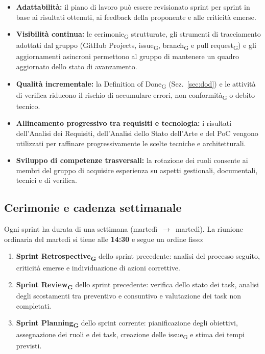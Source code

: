 \begin{itemize}
\item \textbf{Adattabilità:} il piano di lavoro può essere revisionato sprint per
sprint in base ai risultati ottenuti, ai feedback della proponente e alle
criticità emerse.
\item \textbf{Visibilità continua:} le cerimonie\textsubscript{G} strutturate, gli strumenti di tracciamento adottati dal gruppo (GitHub Projects,
issue\textsubscript{G}, branch\textsubscript{G} e pull request\textsubscript{G}) e
gli aggiornamenti asincroni permettono al gruppo di mantenere un quadro
aggiornato dello stato di avanzamento.
\item \textbf{Qualità incrementale:} la Definition of Done\textsubscript{G}
(Sez.~\ref{sec:dod}) e le attività di verifica riducono il rischio di
accumulare errori, non conformità\textsubscript{G} o debito tecnico.
\item \textbf{Allineamento progressivo tra requisiti e tecnologia:} i risultati
dell'Analisi dei Requisiti, dell'Analisi dello Stato dell'Arte e del PoC
vengono utilizzati per raffinare progressivamente le scelte tecniche e
architetturali.
\item \textbf{Sviluppo di competenze trasversali:} la rotazione dei ruoli
consente ai membri del gruppo di acquisire esperienza su aspetti
gestionali, documentali, tecnici e di verifica.
\end{itemize}

\subsection{Cerimonie e cadenza settimanale}

Ogni sprint ha durata di una settimana (martedì~$\rightarrow$~martedì).
La riunione ordinaria del martedì si tiene alle \textbf{14:30} e segue un ordine
fisso:
\begin{enumerate}
\item \textbf{Sprint Retrospective\textsubscript{G}} dello sprint precedente:
analisi del processo seguito, criticità emerse e individuazione di azioni
correttive.
\item \textbf{Sprint Review\textsubscript{G}} dello sprint precedente:
verifica dello stato dei task, analisi degli scostamenti tra preventivo e
consuntivo e valutazione dei task non completati.
\item \textbf{Sprint Planning\textsubscript{G}} dello sprint corrente:
pianificazione degli obiettivi, assegnazione dei ruoli e dei task,
creazione delle issue\textsubscript{G} e stima dei tempi previsti.
\end{enumerate}


